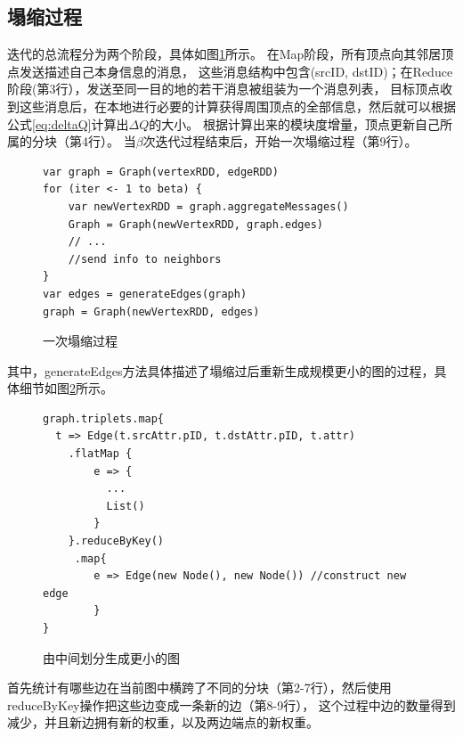 \documentclass[master]{njuthesis}
\begin{document}
\subsection{塌缩过程}
迭代的总流程分为两个阶段，具体如图\ref{fig:coarse}所示。
在Map阶段，所有顶点向其邻居顶点发送描述自己本身信息的消息，
这些消息结构中包含(srcID, dstID)；在Reduce阶段(第3行），发送至同一目的地的若干消息被组装为一个消息列表，
目标顶点收到这些消息后，在本地进行必要的计算获得周围顶点的全部信息，然后就可以根据公式\ref{eq:deltaQ}计算出$\Delta Q$的大小。
根据计算出来的模块度增量，顶点更新自己所属的分块（第4行）。
当$\beta$次迭代过程结束后，开始一次塌缩过程（第9行）。
\begin{figure}[H]
  \centering
\begin{lstlisting}
var graph = Graph(vertexRDD, edgeRDD)
for (iter <- 1 to beta) {
    var newVertexRDD = graph.aggregateMessages()
    Graph = Graph(newVertexRDD, graph.edges)
    // ...
    //send info to neighbors  
}
var edges = generateEdges(graph)
graph = Graph(newVertexRDD, edges)
\end{lstlisting}
\caption{一次塌缩过程}
   \label{fig:coarse}
\end{figure}

其中，generateEdges方法具体描述了塌缩过后重新生成规模更小的图的过程，具体细节如图\ref{fig:smaller_graph}所示。
\begin{figure}[t]
  \centering
\begin{lstlisting}
graph.triplets.map{
  t => Edge(t.srcAttr.pID, t.dstAttr.pID, t.attr)
	.flatMap {
	    e => {
	      ...
	      List()
	    }
	}.reduceByKey()
	 .map{
	    e => Edge(new Node(), new Node()) //construct new edge
	    }
}
\end{lstlisting}
\caption{由中间划分生成更小的图}
   \label{fig:smaller_graph}
\end{figure}
首先统计有哪些边在当前图中横跨了不同的分块（第2-7行），然后使用reduceByKey操作把这些边变成一条新的边（第8-9行），
这个过程中边的数量得到减少，并且新边拥有新的权重，以及两边端点的新权重。
\end{document}
